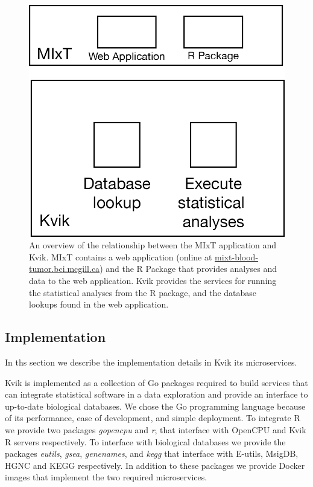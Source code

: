 \begin{figure}[h!]
\centering
\includegraphics{figures/kvik-mixt.png}
\caption{An overview of the relationship between the MIxT application and Kvik.
MIxT contains a web application (online at \url{mixt-blood-tumor.bci.mcgill.ca})
and the R Package that provides analyses and data to the web application. Kvik
provides the services for running the statistical analyses from the R package,
and the database lookups found in the web application.} \label{kvik-mixt}
\end{figure} 


\subsection*{Implementation} 
In ths section we describe the implementation details in Kvik its microservices.

Kvik is implemented as a collection of Go packages required to build services
that can integrate statistical software in a data exploration and provide an
interface to up-to-date biological databases. We chose the Go programming
language because of its performance, ease of development, and simple deployment.
To integrate R we provide two packages \emph{gopencpu} and \emph{r}, that
interface with OpenCPU and Kvik R servers respectively. To interface with
biological databases we provide the packages \emph{eutils}, \emph{gsea},
\emph{genenames}, and \emph{kegg} that interface with E-utils, MsigDB, HGNC and
KEGG respectively.  In addition to these packages we provide Docker images that
implement the two required microservices. 

